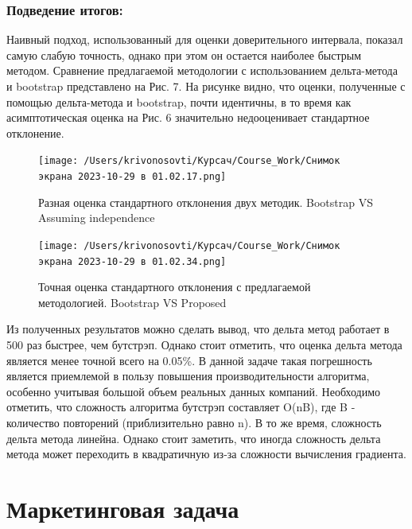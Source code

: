 \documentclass[specialist,
               substylefile = spbu_report.rtx,
               subf,href,colorlinks=true, 12pt]{disser}
\begin{document}



    
    \subsubsection{Подведение итогов:}

        Наивный подход, использованный для оценки доверительного интервала, показал самую слабую точность, однако при этом он остается наиболее быстрым методом. Сравнение предлагаемой методологии с использованием дельта-метода и bootstrap представлено на Рис. 7. На рисунке видно, что оценки, полученные с помощью дельта-метода и bootstrap, почти идентичны, в то время как асимптотическая оценка на Рис. 6 значительно недооценивает стандартное отклонение.

        \begin{figure}[h]
            \centering
            \texttt{[image: /Users/krivonosovti/Курсач/Course\_Work/Снимок экрана 2023-10-29 в 01.02.17.png]}
            \caption{Разная оценка стандартного отклонения двух методик.  Bootstrap VS Assuming independence}
        \end{figure}
        
        \begin{figure}[h]
            \centering
            \texttt{[image: /Users/krivonosovti/Курсач/Course\_Work/Снимок экрана 2023-10-29 в 01.02.34.png]}
            \caption{Точная оценка стандартного отклонения с предлагаемой методологией. Bootstrap VS  Proposed}
        \end{figure}


        Из полученных результатов можно сделать вывод, что дельта метод работает в 500 раз быстрее, чем бутстрэп. Однако стоит отметить, что оценка дельта метода является менее точной всего на 0.05\%. В данной задаче такая погрешность является приемлемой в пользу повышения производительности алгоритма, особенно учитывая большой объем реальных данных компаний. Необходимо отметить, что сложность алгоритма бутстрэп составляет O(nB), где B - количество повторений (приблизительно равно n). В то же время, сложность дельта метода линейна. Однако стоит заметить, что иногда сложность дельта метода может переходить в квадратичную из-за сложности вычисления градиента.

\section{Маркетинговая задача}
\end{document}
